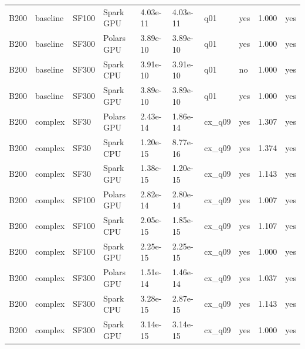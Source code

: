 \begin{longtable}{llllllllrl}
B200 & baseline & SF100 & Spark GPU & 4.03e-11 & 4.03e-11 & q01 & yes & 1.000 & yes \\
B200 & baseline & SF300 & Polars GPU & 3.89e-10 & 3.89e-10 & q01 & yes & 1.000 & yes \\
B200 & baseline & SF300 & Spark CPU & 3.91e-10 & 3.91e-10 & q01 & no & 1.000 & yes \\
B200 & baseline & SF300 & Spark GPU & 3.89e-10 & 3.89e-10 & q01 & yes & 1.000 & yes \\
B200 & complex & SF30 & Polars GPU & 2.43e-14 & 1.86e-14 & cx\_q09 & yes & 1.307 & yes \\
B200 & complex & SF30 & Spark CPU & 1.20e-15 & 8.77e-16 & cx\_q09 & yes & 1.374 & yes \\
B200 & complex & SF30 & Spark GPU & 1.38e-15 & 1.20e-15 & cx\_q09 & yes & 1.143 & yes \\
B200 & complex & SF100 & Polars GPU & 2.82e-14 & 2.80e-14 & cx\_q09 & yes & 1.007 & yes \\
B200 & complex & SF100 & Spark CPU & 2.05e-15 & 1.85e-15 & cx\_q09 & yes & 1.107 & yes \\
B200 & complex & SF100 & Spark GPU & 2.25e-15 & 2.25e-15 & cx\_q09 & yes & 1.000 & yes \\
B200 & complex & SF300 & Polars GPU & 1.51e-14 & 1.46e-14 & cx\_q09 & yes & 1.037 & yes \\
B200 & complex & SF300 & Spark CPU & 3.28e-15 & 2.87e-15 & cx\_q09 & yes & 1.143 & yes \\
B200 & complex & SF300 & Spark GPU & 3.14e-15 & 3.14e-15 & cx\_q09 & yes & 1.000 & yes \\
\end{longtable}
